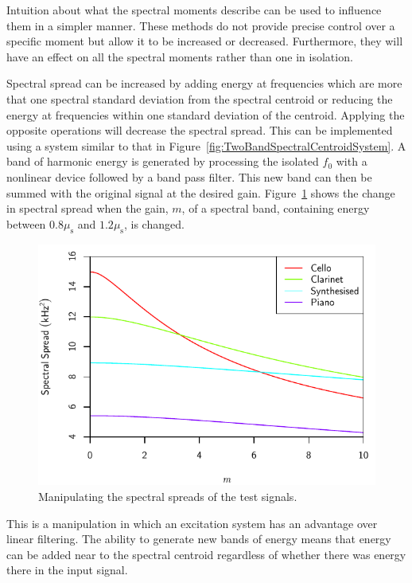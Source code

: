 			Intuition about what the spectral moments describe can be used to influence them in a simpler
			manner. These methods do not provide precise control over a specific moment but allow it to be
			increased or decreased.  Furthermore, they will have an effect on all the spectral moments rather
			than one in isolation. 
			
			Spectral spread can be increased by adding energy at frequencies which are more that one spectral
			standard deviation from the spectral centroid or reducing the energy at frequencies within one
			standard deviation of the centroid. Applying the opposite operations will decrease the spectral
			spread. This can be implemented using a system similar to that in
			Figure~\ref{fig:TwoBandSpectralCentroidSystem}. A band of harmonic energy is generated by
			processing the isolated $f_{0}$ with a nonlinear device followed by a band pass filter. This new
			band can then be summed with the original signal at the desired gain. Figure~\ref{fig:MoveSpreads}
			shows the change in spectral spread when the gain, $m$, of a spectral band, containing energy
			between $0.8\mu_{\mathrm{s}}$ and $1.2\mu_{\mathrm{s}}$, is changed.

			\begin{figure}[h!]
				\centering
				\includegraphics{chapter6/Images/MoveSpreads.pdf}
				\caption{Manipulating the spectral spreads of the test signals.}
				\label{fig:MoveSpreads}
			\end{figure}

			This is a manipulation in which an excitation system has an advantage over linear filtering. The
			ability to generate new bands of energy means that energy can be added near to the spectral
			centroid regardless of whether there was energy there in the input signal.

